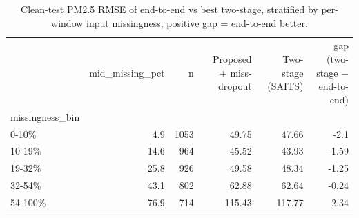 \begin{table}
\caption{Clean-test PM2.5 RMSE of end-to-end vs best two-stage, stratified by per-window input missingness; positive gap = end-to-end better.}
\label{tab:stratified}
\begin{tabular}{lrrrrr}
\toprule
 & mid\_missing\_pct & n & Proposed + miss-dropout & Two-stage (SAITS) & gap (two-stage − end-to-end) \\
missingness_bin &  &  &  &  &  \\
\midrule
0-10\% & 4.9 & 1053 & 49.75 & 47.66 & -2.1 \\
10-19\% & 14.6 & 964 & 45.52 & 43.93 & -1.59 \\
19-32\% & 25.8 & 926 & 49.58 & 48.34 & -1.25 \\
32-54\% & 43.1 & 802 & 62.88 & 62.64 & -0.24 \\
54-100\% & 76.9 & 714 & 115.43 & 117.77 & 2.34 \\
\bottomrule
\end{tabular}
\end{table}
